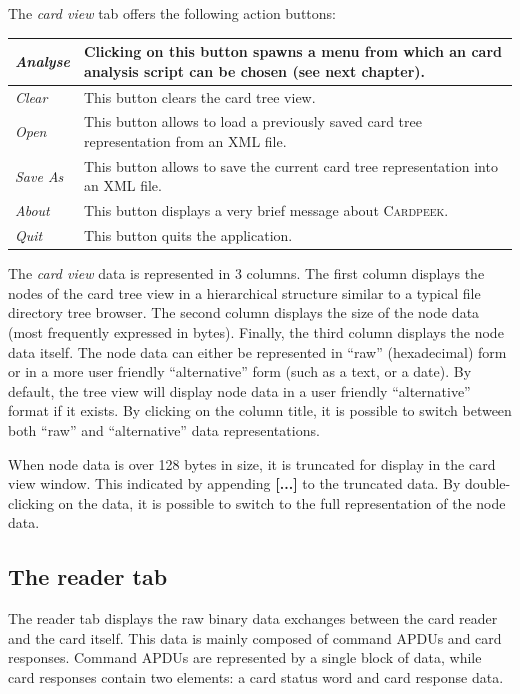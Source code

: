 \documentclass[11pt]{report}
\newcommand{\Cardpeek}{\textsc{Cardpeek}}
\begin{document}
The \emph{card view} tab offers the following action buttons:

\vspace{1em}\noindent
\begin{tabular}{l|p{12cm}}
\hline
\emph{Analyse}    & Clicking on this button spawns a menu from which an card analysis script can be chosen (see next chapter). \\  
\hline
\emph{Clear}      & This button clears the card tree view.\\
\hline
\emph{Open}       & This button allows to load a previously saved card tree representation from an XML file.\\
\hline
\emph{Save As}    & This button allows to save the current card tree representation into an XML file. \\
\hline
\emph{About}      & This button displays a very brief message about \Cardpeek. \\
\hline
\emph{Quit}       & This button quits the application. \\
\hline
\end{tabular}
\vspace{2em}

The \emph{card view} data is represented in 3 columns. The first column displays the nodes of the card tree view
in a hierarchical structure similar to a typical file directory tree browser. The second column displays the size
of the node data (most frequently expressed in bytes). Finally, the third column displays the node data itself.
The node data can either be represented in ``raw'' (hexadecimal) form or in a more user friendly ``alternative'' form
(such as a text, or a date).
By default, the tree view will display node data in a user friendly ``alternative'' format if it exists. 
By clicking on the column title, it is possible to switch between both ``raw'' and ``alternative'' data representations.

When node data is over 128 bytes in size, it is truncated for display in the card view window. 
This indicated by appending \textbf{[...]} to the truncated data. By double-clicking on the data, it is possible
to switch to the full representation of the node data.

\subsection{The reader tab}

The reader tab displays the raw binary data exchanges between the card reader and the card itself. 
This data is mainly composed of command APDUs and card responses. Command APDUs are represented by a single
block of data, while card responses contain two elements: a card status word and card response data.
\end{document}
